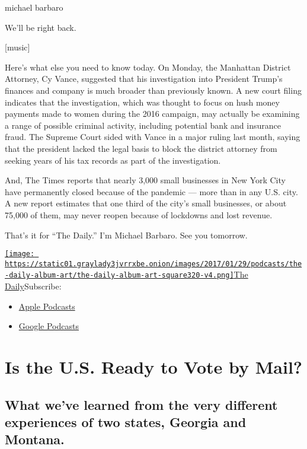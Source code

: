 michael barbaro

We'll be right back.

{[}music{]}

Here's what else you need to know today. On Monday, the Manhattan
District Attorney, Cy Vance, suggested that his investigation into
President Trump's finances and company is much broader than previously
known. A new court filing indicates that the investigation, which was
thought to focus on hush money payments made to women during the 2016
campaign, may actually be examining a range of possible criminal
activity, including potential bank and insurance fraud. The Supreme
Court sided with Vance in a major ruling last month, saying that the
president lacked the legal basis to block the district attorney from
seeking years of his tax records as part of the investigation.

And, The Times reports that nearly 3,000 small businesses in New York
City have permanently closed because of the pandemic --- more than in
any U.S. city. A new report estimates that one third of the city's small
businesses, or about 75,000 of them, may never reopen because of
lockdowns and lost revenue.

That's it for ``The Daily.'' I'm Michael Barbaro. See you tomorrow.

\href{https://www.nytimes3xbfgragh.onion/column/the-daily}{\texttt{[image: https://static01.graylady3jvrrxbe.onion/images/2017/01/29/podcasts/the-daily-album-art/the-daily-album-art-square320-v4.png]}The
Daily}Subscribe:

\begin{itemize}
\tightlist
\item
  \href{https://itunes.apple.com/us/podcast/id1200361736}{Apple
  Podcasts}
\item
  \href{https://www.google.com/podcasts?feed=aHR0cHM6Ly9yc3MuYXJ0MTkuY29tL3RoZS1kYWlseQ\%3D\%3D}{Google
  Podcasts}
\end{itemize}

\hypertarget{is-the-us-ready-to-vote-by-mail-1}{%
\section{Is the U.S. Ready to Vote by
Mail?}\label{is-the-us-ready-to-vote-by-mail-1}}

\hypertarget{what-weve-learned-from-the-very-different-experiences-of-two-states-georgia-and-montana-1}{%
\subsection{What we've learned from the very different experiences of
two states, Georgia and
Montana.}\label{what-weve-learned-from-the-very-different-experiences-of-two-states-georgia-and-montana-1}}

